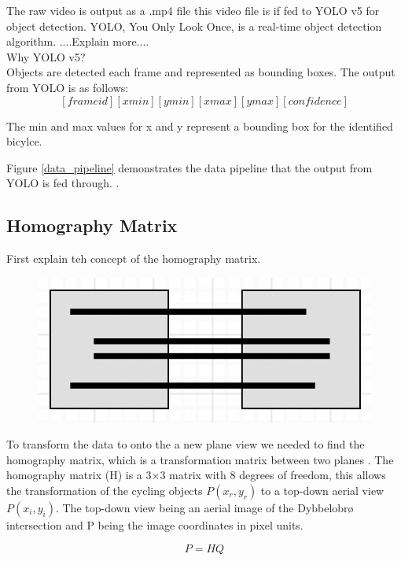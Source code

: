 \documentclass[
10pt, %
a4paper, %
oneside, %
headinclude,footinclude, %
] {book}%
\begin{document}
The raw video is output as a .mp4 file this video file is if fed to YOLO v5 for object detection. YOLO, You Only Look Once,
is a real-time object detection algorithm. ....Explain more.... 
\ \\ 
Why YOLO v5?
\ \\ 
Objects are detected each frame and represented as bounding boxes.
The output from YOLO is as follows: \[ [frame id][xmin][ymin][xmax][ymax][confidence]  \]

The min and max values for x and y represent a bounding box for the identified bicylce.

Figure \ref{data_pipeline} demonstrates the data pipeline that the output from YOLO is fed through. .
\ \\
\subsection{Homography Matrix}

First explain teh concept of the homography matrix.
\ \\ 
\begin{figure}[h]
  \includegraphics[scale=1.0]{Homography_proj.png}
  \centering 
  \end{figure}
  \label{homography}

To transform the data to onto the a new plane view we needed to find the homography matrix, which is a transformation matrix between two planes \cite{hartley_zisserman_2004}.
The homography matrix (H) is a 3×3 matrix with 8 degrees of freedom, this allows the transformation of the cycling objects $P(x_r, y_r)$ to a 
top-down aerial view $P(x_i, y_i)$. The top-down view being an aerial image of the Dybbelobrø intersection and P being the image coordinates in pixel units.

\begin{equation}
  P = HQ\label{eq:2}
\end{equation} 
\end{document}
